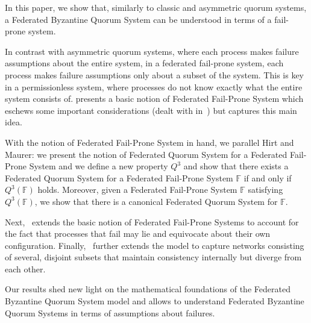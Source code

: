 \documentclass[11pt]{article}
\begin{document}
In this paper, we show that, similarly to classic and asymmetric quorum systems, a Federated Byzantine Quorum System can be understood in terms of a fail-prone system.

In contrast with asymmetric quorum systems, where each process makes failure assumptions about the entire system, in a federated fail-prone system, each process makes failure assumptions only about a subset of the system.
This is key in a permissionless system, where processes do not know exactly what the entire system consists of.
 presents a basic notion of Federated Fail-Prone System which eschews some important considerations (dealt with in~) but captures this main idea.


With the notion of Federated Fail-Prone System in hand, we parallel Hirt and Maurer: we present the notion of Federated Quorum System for a Federated Fail-Prone System and we define a new property $Q^3$ and show that there exists a Federated Quorum System for a Federated Fail-Prone System $\mathbb{F}$ if and only if $Q^3(\mathbb{F})$ holds. Moreover, given a Federated Fail-Prone System $\mathbb{F}$ satisfying $Q^3(\mathbb{F})$, we show that there is a canonical Federated Quorum System for $\mathbb{F}$.

Next,~ extends the basic notion of Federated Fail-Prone Systems to account for the fact that processes that fail may lie and equivocate about their own configuration. Finally,~ further extends the model to capture networks consisting of several, disjoint subsets that maintain consistency internally but diverge from each other.

Our results shed new light on the mathematical foundations of the Federated Byzantine Quorum System model and allows to understand Federated Byzantine Quorum Systems in terms of assumptions about failures.

\end{document}
